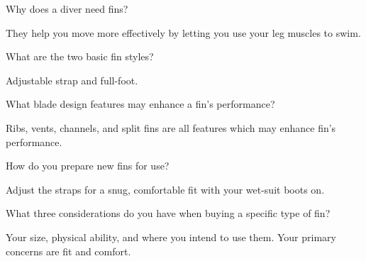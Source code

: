 	\begin{qanda}
		\begin{question}
Why does a diver need fins?
		\end{question}

		\begin{answer}
They help you move more effectively by letting you use your leg muscles to swim.
		\end{answer}
	\end{qanda}

	\begin{qanda}
		\begin{question}
What are the two basic fin styles?
		\end{question}

		\begin{answer}
Adjustable strap and full-foot.
		\end{answer}
	\end{qanda}

	\begin{qanda}
		\begin{question}
What blade design features may enhance a fin's performance?
		\end{question}

		\begin{answer}
Ribs, vents, channels, and split fins are all features which may enhance fin's performance.%
		\end{answer}
	\end{qanda}

	\begin{qanda}
		\begin{question}
How do you prepare new fins for use?
		\end{question}

		\begin{answer}
Adjust the straps for a snug, comfortable fit with your wet-suit boots on.
		\end{answer}
	\end{qanda}

	\begin{qanda}
		\begin{question}
What three considerations do you have when buying a specific type of fin?
		\end{question}

		\begin{answer}
Your size, physical ability, and where you intend to use them.  Your primary concerns are fit and comfort.
		\end{answer}
	\end{qanda}

